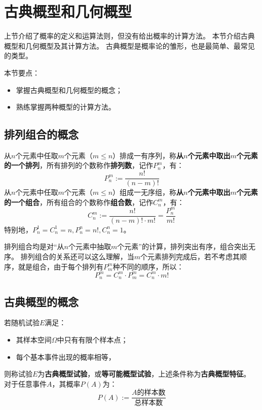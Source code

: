 \section{古典概型和几何概型}

上节介绍了概率的定义和运算法则，但没有给出概率的计算方法。
本节介绍古典概型和几何概型及其计算方法。
古典概型是概率论的雏形，也是最简单、最常见的类型。

本节要点：
\begin{itemize}
    \item 掌握古典概型和几何概型的概念；
    \item 熟练掌握两种概型的计算方法。
\end{itemize}

\subsection{排列组合的概念}

\begin{definition}[排列和组合]
从$n$个元素中任取$m$个元素（$m\leqslant n$）排成一有序列，称{\bf 从$n$个元素中取出$m$个元素的一个排列}，所有排列的个数称作{\bf 排列数}，记作$P_{n}^{m}$，有：
\[
P_{n}^{m}:=\frac{n!}{\left( n-m \right) !}
\]
从$n$个元素中任取$m$个元素（$m\leqslant n$）组成一无序组，称{\bf 从$n$个元素中取出$m$个元素的一个组合}，所有组合的个数称作{\bf 组合数}，记作$C_{n}^{m}$，有：
\[
C_{n}^{m}:=\frac{n!}{\left( n-m \right) !\cdot m!}=\frac{P_{n}^{m}}{m!}
\]
特别地，$P_{n}^{1}=C_{n}^{1}=n,P_{n}^{n}=n!,C_{n}^{n}=1$。
\end{definition}

排列组合均是对“从$n$个元素中抽取$m$个元素”的计算，排列突出有序，组合突出无序。
排列组合的关系还可以这么理解，当$m$个元素排列完成后，若不考虑其顺序，就是组合，由于每个排列有$P_{m}^{m}$种不同的顺序，所以：
\[
P_{n}^{m}=C_{n}^{m}\cdot P_{m}^{m}=C_{n}^{m}\cdot m!
\]

\subsection{古典概型的概念}

\begin{definition}[古典概型]
若随机试验$E$满足：
\begin{itemize}
    \item 其样本空间$\varOmega $中只有有限个样本点；
    \item 每个基本事件出现的概率相等，
\end{itemize}
则称试验$E$为{\bf 古典概型试验}，或{\bf 等可能概型试验}，上述条件称为{\bf 古典概型特征}。
对于任意事件$A$，其概率$P\left( A \right) $为：
\[
P\left( A \right) :=\frac{A\text{的样本数}}{\text{总样本数}}
\]
\end{definition}

